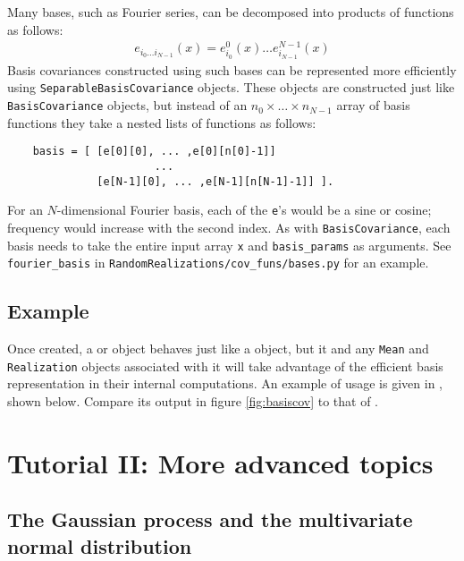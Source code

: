 \documentclass[]{manual}
\begin{document}
Many bases, such as Fourier series, can be decomposed into products of functions as follows:
\begin{eqnarray*}
    e_{i_0\ldots i_{N-1}}(x) = e^0_{i_0}(x)\ldots e^{N-1}_{i_{N-1}}(x)
\end{eqnarray*}
Basis covariances constructed using such bases can be represented more efficiently using \texttt{SeparableBasisCovariance} objects. These objects are constructed just like \texttt{BasisCovariance} objects, but instead of an $n_0\times \ldots \times n_{N-1}$ array of basis functions they take a nested lists of functions as follows:
\begin{verbatim}
    basis = [ [e[0][0], ... ,e[0][n[0]-1]]
                       ...
              [e[N-1][0], ... ,e[N-1][n[N-1]-1]] ].
\end{verbatim}
For an $N$-dimensional Fourier basis, each of the \texttt{e}'s would be a sine or cosine; frequency would increase with the second index. As with \texttt{BasisCovariance}, each basis needs to take the entire input array \texttt{x} and \texttt{basis_params} as arguments. See \texttt{fourier_basis} in \texttt{RandomRealizations/cov_funs/bases.py} for an example.

\section{Example}

Once created, a  or  object behaves just like a  object, but it and any \texttt{Mean} and \texttt{Realization} objects associated with it will take advantage of the efficient basis representation in their internal computations. An example of  usage is given in , shown below. Compare its output in figure \ref{fig:basiscov} to that of .




\chapter{Tutorial II: More advanced topics}\label{cha:adv} %

\section{The Gaussian process and the multivariate normal distribution}
\end{document}
